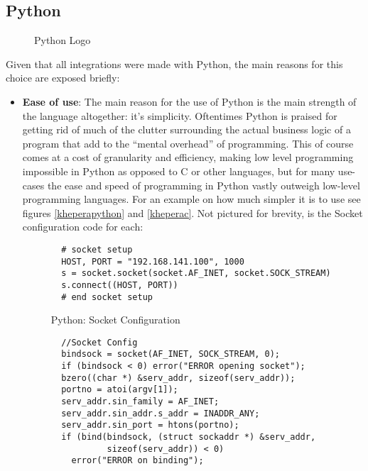 \subsection{Python} \label{python}
\begin{figure}[H]
\centering

\caption{Python Logo}
\end{figure}
Given that all integrations were made with Python, the main reasons for this choice are exposed briefly:
\begin{itemize}
  \item \textbf{Ease of use}: The main reason for the use of Python is the main strength of the language altogether: it's simplicity. 
  Oftentimes Python is praised for getting rid of much of the clutter surrounding the actual business logic of a program that add to the 
  ``mental overhead'' of programming. This of course comes at a cost of granularity and efficiency, making low level programming 
  impossible in Python as opposed to C or other languages, but for many use-cases the ease and speed of programming in Python vastly 
  outweigh low-level programming languages. For an example on how much simpler it is to use see figures \ref{kheperapython} and 
  \ref{kheperac}. Not pictured for brevity, is the Socket configuration code for each:
  \begin{figure}[H]  
  \centering
  \captionsetup{justification=centering}
  \begin{verbatim}
  # socket setup
  HOST, PORT = "192.168.141.100", 1000
  s = socket.socket(socket.AF_INET, socket.SOCK_STREAM)
  s.connect((HOST, PORT))
  # end socket setup
  \end{verbatim}
  \caption{Python: Socket Configuration}
  \end{figure}
  \begin{figure}[H]  
  \centering
  \captionsetup{justification=centering}
  \begin{verbatim}
  //Socket Config
  bindsock = socket(AF_INET, SOCK_STREAM, 0);
  if (bindsock < 0) error("ERROR opening socket");
  bzero((char *) &serv_addr, sizeof(serv_addr));
  portno = atoi(argv[1]);
  serv_addr.sin_family = AF_INET;
  serv_addr.sin_addr.s_addr = INADDR_ANY;
  serv_addr.sin_port = htons(portno);
  if (bind(bindsock, (struct sockaddr *) &serv_addr,
           sizeof(serv_addr)) < 0)
    error("ERROR on binding");

\end{verbatim}
\end{figure}
\end{itemize}
